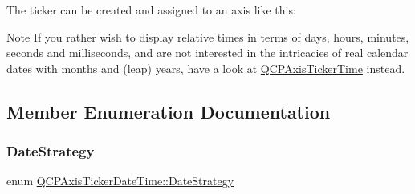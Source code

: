 The ticker can be created and assigned to an axis like this\+: 
\begin{DoxyCodeInclude}{0}
\end{DoxyCodeInclude}
 \begin{DoxyNote}{Note}
If you rather wish to display relative times in terms of days, hours, minutes, seconds and milliseconds, and are not interested in the intricacies of real calendar dates with months and (leap) years, have a look at \mbox{\hyperlink{class_q_c_p_axis_ticker_time}{Q\+C\+P\+Axis\+Ticker\+Time}} instead. 
\end{DoxyNote}


\subsection{Member Enumeration Documentation}
\mbox{\label{class_q_c_p_axis_ticker_date_time_af2c7c60821a6234ca7a172f42ef7f1d8}} 
\subsubsection{\texorpdfstring{DateStrategy}{DateStrategy}}
{\footnotesize\ttfamily enum \mbox{\hyperlink{class_q_c_p_axis_ticker_date_time_af2c7c60821a6234ca7a172f42ef7f1d8}{Q\+C\+P\+Axis\+Ticker\+Date\+Time\+::\+Date\+Strategy}}\hspace{0.3cm}{\ttfamily [protected]}}


